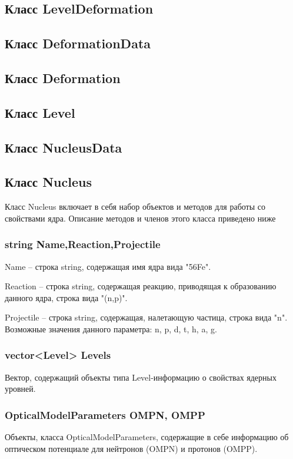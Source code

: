\documentclass[a4paper,12pt]{extarticle}
\begin{document}
\subsection{Класс LevelDeformation}

\subsection{Класс DeformationData}

\subsection{Класс Deformation}

\subsection{Класс Level}

\subsection{Класс NucleusData}

\subsection{Класс Nucleus}
Класс Nucleus включает в себя набор объектов и методов для работы со свойствами ядра. Описание методов и членов этого класса приведено ниже
\subsubsection{string Name,Reaction,Projectile}
Name -- строка string, содержащая имя ядра вида "56Fe".

Reaction -- строка string, содержащая реакцию, приводящая к образованию данного ядра, строка вида "(n,p)".

Projectile -- строка string, содержащая, налетающую частица, строка вида "n". Возможные значения данного параметра: n, p, d, t, h, a, g.
\subsubsection{vector<Level> Levels}
Вектор, содержащий объекты типа Level-информацию о свойствах ядерных уровней.
\subsubsection{OpticalModelParameters OMPN, OMPP}
Объекты, класса OpticalModelParameters, содержащие в себе информацию об оптическом потенциале для нейтронов (OMPN) и протонов (OMPP).
\end{document}
